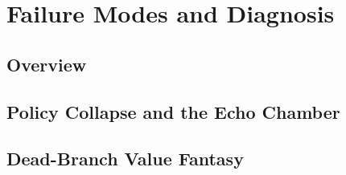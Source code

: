
\chapter{Failure Modes and Diagnosis}\label{chap:failure-modes}


\section{Overview}\label{sec:failure-overview}


\section{Policy Collapse and the Echo Chamber}\label{sec:failure-echo-chamber}


\section{Dead-Branch Value Fantasy}\label{sec:failure-dead-branch}


